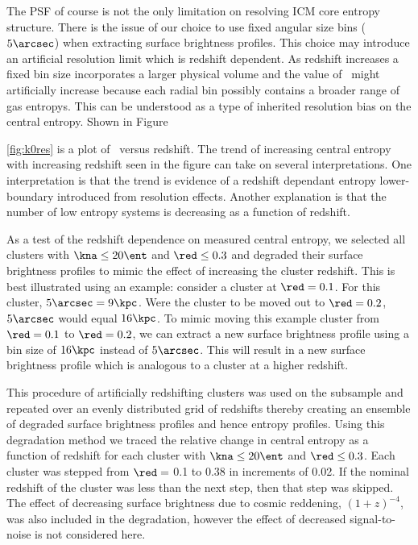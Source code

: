 \documentclass[12pt, preprint]{aastex}
\begin{document}
{The PSF of course is not the only limitation on resolving ICM core
entropy structure. There is the issue of our choice to use fixed
angular size bins ($5\arcsec$) when extracting surface brightness
profiles. This choice may introduce an artificial resolution limit which
is redshift dependent. As redshift increases a fixed bin size
incorporates a larger physical volume and the value of \kna\ might
artificially increase because each radial bin possibly contains a
broader range of gas entropys. This can be understood as a type of
inherited resolution bias on the central entropy. Shown in Figure
{\ref{fig:k0res} is a plot of \kna\ versus redshift. The trend of
increasing central entropy with increasing redshift seen in the figure
can take on several interpretations. One interpretation is that the
trend is evidence of a redshift dependant entropy lower-boundary
introduced from resolution effects. Another explanation is that the
number of low entropy systems is decreasing as a function of redshift.

As a test of the redshift dependence on measured central entropy, we
selected all clusters with $\kna \leq 20 \ent$ and $\red \leq 0.3$
and degraded their surface brightness profiles to mimic the effect of
increasing the cluster redshift. This is best illustrated using an
example: consider a cluster at $\red = 0.1$. For this cluster,
$5\arcsec = 9 \kpc$. Were the cluster to be moved out to $\red = 0.2$,
$5\arcsec$ would equal $16 \kpc$. To mimic moving this example cluster
from $\red = 0.1$ to $\red = 0.2$, we can extract a new surface
brightness profile using a bin size of $16\kpc$ instead of
$5\arcsec$. This will result in a new surface brightness profile which
is analogous to a cluster at a higher redshift.

This procedure of artificially redshifting clusters was used on the
subsample and repeated over an evenly distributed grid of redshifts
thereby creating an ensemble of degraded surface brightness profiles
and hence entropy profiles. Using this degradation method we traced
the relative change in central entropy as a function of redshift for
each cluster with $\kna \leq 20 \ent$ and $\red \leq 0.3$. Each
cluster was stepped from $\red =$ 0.1 to  0.38 in increments of
0.02. If the nominal redshift of the cluster was less than the next
step, then that step was skipped. The effect of decreasing surface
brightness due to cosmic reddening, $(1+z)^{-4}$, was also included in
the degradation, however the effect of decreased signal-to-noise is
not considered here.

}}
\end{document}

